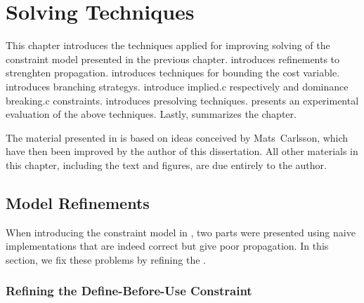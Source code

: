 %

\chapter{Solving Techniques}

This chapter introduces the techniques applied for improving solving of the
\gls{constraint model} presented in the previous chapter.
%
 introduces 
refinements to strenghten \gls{propagation}.
%
 introduces techniques for bounding the \gls{cost
  variable}.
%
 introduces \glspl{branching strategy}.
%
 introduce
\gls{implied.c} respectively  and \gls{dominance
  breaking.c} \glspl{constraint}.
%
 introduces \gls{presolving} techniques.
%
 presents an experimental evaluation of
the above techniques.
%
Lastly,  summarizes the chapter.

The material presented in  is based on ideas conceived by
Mats~Carlsson, which have then been improved by the author of this dissertation.
%
All other materials in this chapter, including the text and figures, are due
entirely to the author.


\section{Model Refinements}

When introducing the \gls{constraint model} in ,
two parts were presented using naive implementations that are indeed correct but
give poor \gls{propagation}.
%
In this section, we fix these problems by refining the .


\subsection{Refining the Define-Before-Use Constraint}

